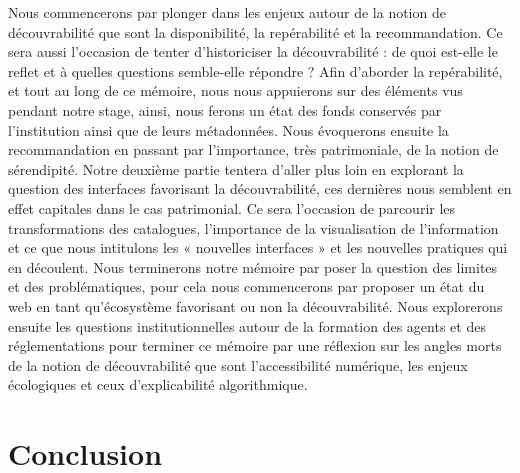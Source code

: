 \documentclass[a4paper,12pt,twoside]{book}
\begin{document}
	Nous commencerons par plonger dans les enjeux autour de la notion de découvrabilité que sont la disponibilité, la repérabilité et la recommandation. Ce sera aussi l’occasion de tenter d’historiciser la découvrabilité : de quoi est-elle le reflet et à quelles questions semble-elle répondre ? Afin d’aborder la repérabilité, et tout au long de ce mémoire, nous nous appuierons sur des éléments vus pendant notre stage, ainsi, nous ferons un état des fonds conservés par l’institution ainsi que de leurs métadonnées. Nous évoquerons ensuite la recommandation en passant par l’importance, très patrimoniale, de la notion de sérendipité. Notre deuxième partie tentera d’aller plus loin en explorant la question des interfaces favorisant la découvrabilité, ces dernières nous semblent en effet capitales dans le cas patrimonial. Ce sera l’occasion de parcourir les transformations des catalogues, l’importance de la visualisation de l’information et ce que nous intitulons les « nouvelles interfaces » et les nouvelles pratiques qui en découlent. Nous terminerons notre mémoire par poser la question des limites et des problématiques, pour cela nous commencerons par proposer un état du web en tant qu’écosystème favorisant ou non la découvrabilité. Nous explorerons ensuite les questions institutionnelles autour de la formation des agents et des réglementations pour terminer ce mémoire par une réflexion sur les angles morts de la notion de découvrabilité que sont l’accessibilité numérique, les enjeux écologiques et ceux d’explicabilité algorithmique.
	\newpage{\pagestyle{empty}\cleardoublepage}
	
	\mainmatter
	
	
	

	
	


	

	
	
	
	
	\chapter*{Conclusion}
	
\end{document}
